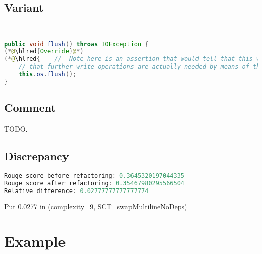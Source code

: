 \documentclass[11pt]{article}
\DeclareRobustCommand{\hlred}[1]{{\sethlcolor{YellowOrange}\hl{#1}}}
\begin{document}
  \subsection{Variant}

  \begin{lstlisting}[language=java]


public void flush() throws IOException {
(*@\hlred{Override}@*)
(*@\hlred{    //  Note here is an assertion that would tell that this writer knows now as is in case we detect}@*)
    // that further write operations are actually needed by means of the isOverflown() method.
    this.os.flush();
}
  \end{lstlisting}

  \subsection{Comment}

  TODO.

  \subsection{Discrepancy}

  \begin{lstlisting}[language=java]
Rouge score before refactoring: 0.3645320197044335
Rouge score after refactoring: 0.35467980295566504
Relative difference: 0.02777777777777774
  \end{lstlisting}

  Put 0.0277 in (complexity=9, SCT=swapMultilineNoDeps)

  \pagebreak
  \section{Example}
\end{document}

